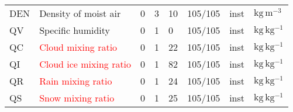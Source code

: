 \begin{table}[H]
\begin{tabular}{p{2.0cm}p{5.0cm}p{0.7cm}p{0.7cm}p{0.7cm}p{1.4cm}p{1cm}p{1cm}}
DEN                        &  Density of moist air                                                                      &               0                                   &                     3                       &                    10                      &                 105/105                         &                      inst                   &        $\mathrm{kg\,m^{-3}}$ \\
QV                         &  Specific humidity                                                                         &               0                                   &                     1                       &                    0                       &                 105/105                         &                      inst                   &        $\mathrm{kg\,kg^{-1}}$ \\
QC                         &  \textcolor{red}{Cloud mixing ratio}\footnotemark[1]                                       &               0                                   &                     1                       &                    22                      &                 105/105                         &                      inst                   &        $\mathrm{kg\,kg^{-1}}$ \\
QI                         &  \textcolor{red}{Cloud ice mixing ratio}\footnotemark[1]                                   &               0                                   &                     1                       &                    82                      &                 105/105                         &                      inst                   &        $\mathrm{kg\,kg^{-1}}$ \\
QR                         &  \textcolor{red}{Rain mixing ratio}\footnotemark[1]                                        &               0                                   &                     1                       &                    24                      &                 105/105                         &                      inst                   &        $\mathrm{kg\,kg^{-1}}$ \\
QS                         &  \textcolor{red}{Snow mixing ratio}\footnotemark[1]                                        &               0                                   &                     1                       &                    25                      &                 105/105                         &                      inst                   &        $\mathrm{kg\,kg^{-1}}$ \\

\end{tabular}
\end{table}

